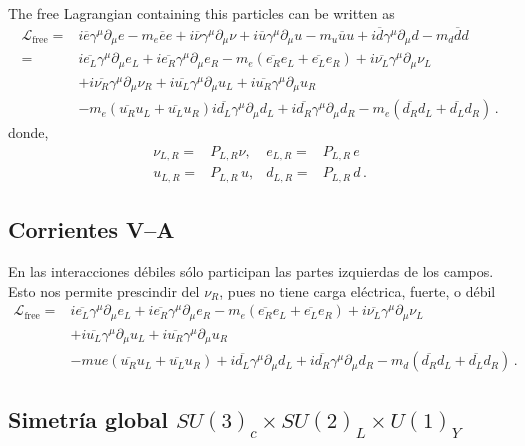 \begin{frame}
The free Lagrangian containing this particles can be written as
\begin{align}
  \mathcal{L}_{\text{free}}=&i\overline{e}\gamma^\mu\partial_\mu e-m_e\overline{e}e+i\overline{\nu}\gamma^\mu\partial_\mu\nu
+i\overline{u}\gamma^\mu\partial_\mu u-m_u\overline{u}u+i\overline{d}\gamma^\mu\partial_\mu d-m_d\overline{d}d\nonumber\\
=&i\overline{e_L}\gamma^\mu\partial_\mu e_L+i\overline{e_R}\gamma^\mu\partial_\mu e_R-m_e(\overline{e_R}e_L+\overline{e_L}e_R)+i\overline{\nu_L}\gamma^\mu\partial_\mu\nu_L\nonumber\\
&+i\overline{\nu_R}\gamma^\mu\partial_\mu\nu_R+i\overline{u_L}\gamma^\mu\partial_\mu u_L+i\overline{u_R}\gamma^\mu\partial_\mu u_R\nonumber\\
&-m_e(\overline{u_R}u_L+\overline{u_L}u_R)
i\overline{d_L}\gamma^\mu\partial_\mu d_L+i\overline{d_R}\gamma^\mu\partial_\mu d_R-m_e(\overline{d_R}d_L+\overline{d_L}d_R)\,.
\end{align}
donde,
\begin{align}
  \nu_{L,R}=&P_{L,R}\nu,& e_{L,R}=&P_{L,R}\,e\nonumber\\
  u_{L,R}=&P_{L,R}\,u,& d_{L,R}=&P_{L,R}\,d\,.
\end{align}

\subsection*{Corrientes V--A}
\label{sec:corrientes-v}
En las interacciones débiles sólo participan las partes izquierdas de los campos. Esto nos permite prescindir del $\nu_R$, pues no tiene carga eléctrica, fuerte, o débil
\begin{align}
  \mathcal{L}_{\text{free}}
=&i\overline{e_L}\gamma^\mu\partial_\mu e_L+i\overline{e_R}\gamma^\mu\partial_\mu e_R-m_e(\overline{e_R}e_L+\overline{e_L}e_R)+
i\overline{\nu_L}\gamma^\mu\partial_\mu\nu_L\nonumber\\
&+i\overline{u_L}\gamma^\mu\partial_\mu u_L+i\overline{u_R}\gamma^\mu\partial_\mu u_R\nonumber\\
&-mue(\overline{u_R}u_L+\overline{u_L}u_R)+
i\overline{d_L}\gamma^\mu\partial_\mu d_L+i\overline{d_R}\gamma^\mu\partial_\mu d_R-m_d(\overline{d_R}d_L+\overline{d_L}d_R)\,.
\end{align}


\subsection*{Simetría global $SU(3)_c\times  SU(2)_L\times  U(1)_Y$}
\label{sec:simetr-glob-su2_l}


\end{frame}
